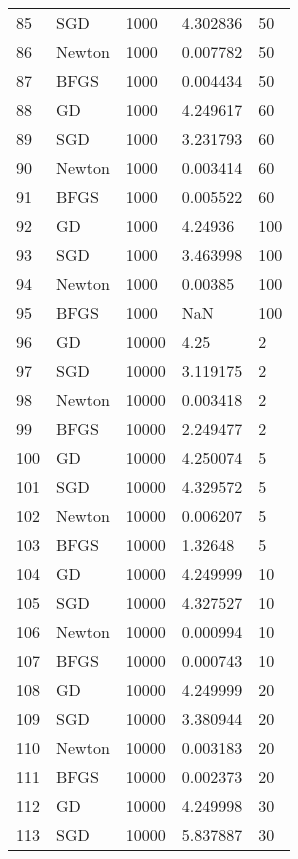 \begin{tabular}{lllll}
85  &     SGD &     1000 &   4.302836 &     50 \\
86  &  Newton &     1000 &   0.007782 &     50 \\
87  &    BFGS &     1000 &   0.004434 &     50 \\
88  &      GD &     1000 &   4.249617 &     60 \\
89  &     SGD &     1000 &   3.231793 &     60 \\
90  &  Newton &     1000 &   0.003414 &     60 \\
91  &    BFGS &     1000 &   0.005522 &     60 \\
92  &      GD &     1000 &    4.24936 &    100 \\
93  &     SGD &     1000 &   3.463998 &    100 \\
94  &  Newton &     1000 &    0.00385 &    100 \\
95  &    BFGS &     1000 &        NaN &    100 \\
96  &      GD &    10000 &       4.25 &      2 \\
97  &     SGD &    10000 &   3.119175 &      2 \\
98  &  Newton &    10000 &   0.003418 &      2 \\
99  &    BFGS &    10000 &   2.249477 &      2 \\
100 &      GD &    10000 &   4.250074 &      5 \\
101 &     SGD &    10000 &   4.329572 &      5 \\
102 &  Newton &    10000 &   0.006207 &      5 \\
103 &    BFGS &    10000 &    1.32648 &      5 \\
104 &      GD &    10000 &   4.249999 &     10 \\
105 &     SGD &    10000 &   4.327527 &     10 \\
106 &  Newton &    10000 &   0.000994 &     10 \\
107 &    BFGS &    10000 &   0.000743 &     10 \\
108 &      GD &    10000 &   4.249999 &     20 \\
109 &     SGD &    10000 &   3.380944 &     20 \\
110 &  Newton &    10000 &   0.003183 &     20 \\
111 &    BFGS &    10000 &   0.002373 &     20 \\
112 &      GD &    10000 &   4.249998 &     30 \\
113 &     SGD &    10000 &   5.837887 &     30 \\

\end{tabular}
